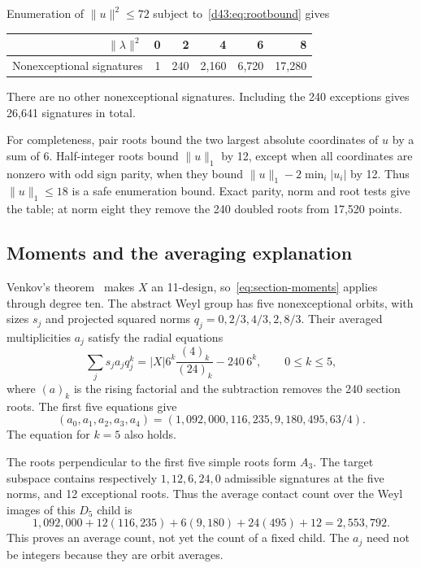 Enumeration of $\|u\|^2\le72$ subject to~\eqref{d43:eq:rootbound} gives
\begin{center}
\begin{tabular}{rrrrrr}\toprule
$\|\lambda\|^2$ &0&2&4&6&8\\\midrule
Nonexceptional signatures &1&240&2,160&6,720&17,280\\\bottomrule
\end{tabular}
\end{center}
There are no other nonexceptional signatures. Including the 240 exceptions
gives 26,641 signatures in total.

For completeness, pair roots bound the two largest absolute coordinates
of $u$ by a sum of 6. Half-integer roots bound $\|u\|_1$ by 12,
except when all coordinates are nonzero with odd sign parity, when they
bound $\|u\|_1-2\min_i|u_i|$ by 12. Thus $\|u\|_1\le18$ is a
safe enumeration bound. Exact parity, norm and root tests give the table;
at norm eight they remove the 240 doubled roots from 17,520 points.

\subsection{Moments and the averaging explanation}
Venkov's theorem~\cite[Theorem 4.1]{nebe-designs} makes $X$ an 11-design,
so~\eqref{eq:section-moments} applies through degree ten. The abstract
Weyl group has five nonexceptional orbits, with sizes $s_j$ and projected
squared norms $q_j=0,2/3,4/3,2,8/3$. Their averaged multiplicities $a_j$
satisfy the radial equations
\begin{equation}\label{d43:eq:radial}
\sum_j s_ja_jq_j^k=|X|6^k\frac{(4)_k}{(24)_k}-240\,6^k,
\qquad 0\le k\le5,
\end{equation}
where $(a)_k$ is the rising factorial and the subtraction removes the
240 section roots. The first five equations give
\[
(a_0,a_1,a_2,a_3,a_4)
=(1,092,000,116,235,9,180,495,63/4).
\]
The equation for $k=5$ also holds.

The roots perpendicular to the first five simple roots form $A_3$.
The target subspace contains respectively $1,12,6,24,0$ admissible
signatures at the five norms, and 12 exceptional roots. Thus the average
contact count over the Weyl images of this $D_5$ child is
\begin{equation}\label{d43:eq:count}
1,092,000+12(116,235)+6(9,180)+24(495)+12=2,553,792.
\end{equation}
This proves an average count, not yet the count of a fixed child.
The $a_j$ need not be integers because they are orbit averages.

